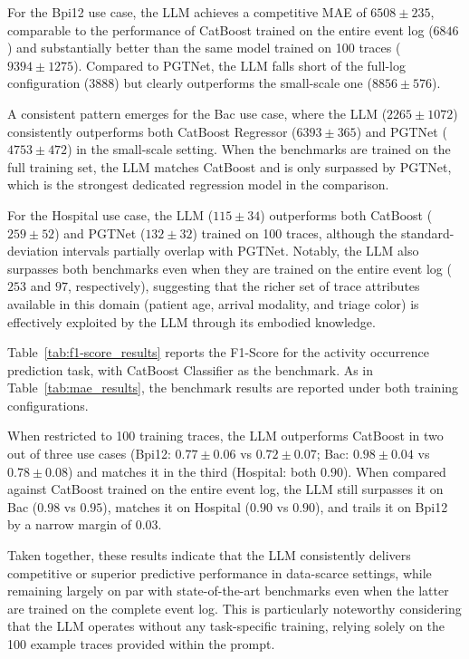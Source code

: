 \documentclass[manuscript,screen,review]{acmart}
\begin{document}
For the Bpi12 use case, the LLM achieves a competitive MAE of $6508 \pm 235$, comparable to the performance of CatBoost trained on the entire event log ($6846$) and substantially better than the same model trained on 100 traces ($9394 \pm 1275$). Compared to PGTNet, the LLM falls short of the full-log configuration ($3888$) but clearly outperforms the small-scale one ($8856 \pm 576$). 

A consistent pattern emerges for the Bac use case, where the LLM ($2265 \pm 1072$) consistently outperforms both CatBoost Regressor ($6393 \pm 365$) and PGTNet ($4753 \pm 472$) in the small-scale setting. When the benchmarks are trained on the full training set, the LLM matches CatBoost and is only surpassed by PGTNet, which is the strongest dedicated regression model in the comparison.

For the Hospital use case, the LLM ($115 \pm 34$) outperforms both CatBoost ($259 \pm 52$) and PGTNet ($132 \pm 32$) trained on 100 traces, although the standard-deviation intervals partially overlap with PGTNet. Notably, the LLM also surpasses both benchmarks even when they are trained on the entire event log ($253$ and $97$, respectively), suggesting that the richer set of trace attributes available in this domain (patient age, arrival modality, and triage color) is effectively exploited by the LLM through its embodied knowledge.

Table~\ref{tab:f1-score_results} reports the F1-Score for the activity occurrence prediction task, with CatBoost Classifier as the benchmark. As in Table~\ref{tab:mae_results}, the benchmark results are reported under both training configurations.

When restricted to 100 training traces, the LLM outperforms CatBoost in two out of three use cases (Bpi12: $0.77 \pm 0.06$ vs $0.72 \pm 0.07$; Bac: $0.98 \pm 0.04$ vs $0.78 \pm 0.08$) and matches it in the third (Hospital: both $0.90$). When compared against CatBoost trained on the entire event log, the LLM still surpasses it on Bac ($0.98$ vs $0.95$), matches it on Hospital ($0.90$ vs $0.90$), and trails it on Bpi12 by a narrow margin of $0.03$.

Taken together, these results indicate that the LLM consistently delivers competitive or superior predictive performance in data-scarce settings, while remaining largely on par with state-of-the-art benchmarks even when the latter are trained on the complete event log. This is particularly noteworthy considering that the LLM operates without any task-specific training, relying solely on the 100 example traces provided within the prompt.
\end{document}

